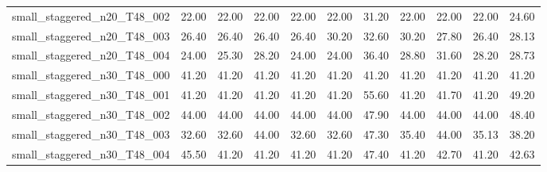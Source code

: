 \begin{table}[htbp]
\begin{tabular}{lrrrrrrrrrr}
small\_staggered\_n20\_T48\_002 & 22.00 & 22.00 & 22.00 & 22.00 & 22.00 & 31.20 & 22.00 & 22.00 & 22.00 & 24.60 \\
small\_staggered\_n20\_T48\_003 & 26.40 & 26.40 & 26.40 & 26.40 & 30.20 & 32.60 & 30.20 & 27.80 & 26.40 & 28.13 \\
small\_staggered\_n20\_T48\_004 & 24.00 & 25.30 & 28.20 & 24.00 & 24.00 & 36.40 & 28.80 & 31.60 & 28.20 & 28.73 \\
small\_staggered\_n30\_T48\_000 & 41.20 & 41.20 & 41.20 & 41.20 & 41.20 & 41.20 & 41.20 & 41.20 & 41.20 & 41.20 \\
small\_staggered\_n30\_T48\_001 & 41.20 & 41.20 & 41.20 & 41.20 & 41.20 & 55.60 & 41.20 & 41.70 & 41.20 & 49.20 \\
small\_staggered\_n30\_T48\_002 & 44.00 & 44.00 & 44.00 & 44.00 & 44.00 & 47.90 & 44.00 & 44.00 & 44.00 & 48.40 \\
small\_staggered\_n30\_T48\_003 & 32.60 & 32.60 & 44.00 & 32.60 & 32.60 & 47.30 & 35.40 & 44.00 & 35.13 & 38.20 \\
small\_staggered\_n30\_T48\_004 & 45.50 & 41.20 & 41.20 & 41.20 & 41.20 & 47.40 & 41.20 & 42.70 & 41.20 & 42.63 \\
\bottomrule
\end{tabular}
\end{table}
